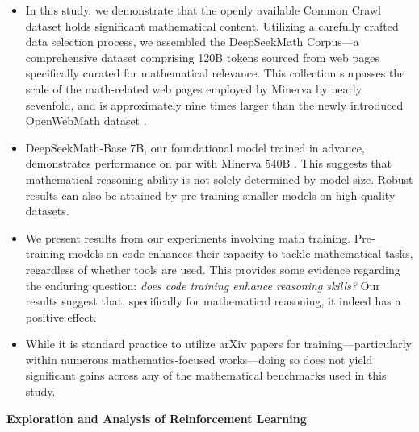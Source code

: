 \begin{itemize}[topsep=0pt]
    \item In this study, we demonstrate that the openly available Common Crawl dataset holds significant mathematical content. Utilizing a carefully crafted data selection process, we assembled the DeepSeekMath Corpus—a comprehensive dataset comprising 120B tokens sourced from web pages specifically curated for mathematical relevance. This collection surpasses the scale of the math-related web pages employed by Minerva \citep{minerva} by nearly sevenfold, and is approximately nine times larger than the newly introduced OpenWebMath dataset \citep{openwebmath}.

\item DeepSeekMath-Base 7B, our foundational model trained in advance, demonstrates performance on par with Minerva 540B \citep{minerva}. This suggests that mathematical reasoning ability is not solely determined by model size. Robust results can also be attained by pre-training smaller models on high-quality datasets.

\item We present results from our experiments involving math training. Pre-training models on code enhances their capacity to tackle mathematical tasks, regardless of whether tools are used. This provides some evidence regarding the enduring question: \textit{does code training enhance reasoning skills?} Our results suggest that, specifically for mathematical reasoning, it indeed has a positive effect.

\item While it is standard practice to utilize arXiv papers for training—particularly within numerous mathematics-focused works—doing so does not yield significant gains across any of the mathematical benchmarks used in this study.
\end{itemize}

\textbf{Exploration and Analysis of Reinforcement Learning}

